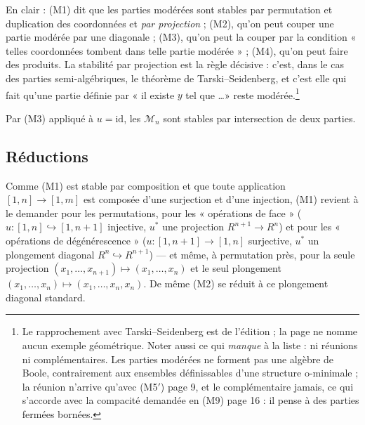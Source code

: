 \documentclass[11pt,a4paper]{article}
\begin{document}
En clair : (M1) dit que les parties modérées sont stables par permutation et
duplication des coordonnées et \emph{par projection} ; (M2), qu'on peut
couper une partie modérée par une diagonale ; (M3), qu'on peut la couper par
la condition « telles coordonnées tombent dans telle partie modérée » ; (M4),
qu'on peut faire des produits. La stabilité par projection est la règle
décisive : c'est, dans le cas des parties semi-algébriques, le théorème de
Tarski–Seidenberg, et c'est elle qui fait qu'une partie définie par « il
existe $y$ tel que \ldots » reste modérée.\footnote{Le rapprochement avec
Tarski–Seidenberg est de l'édition ; la page ne nomme aucun exemple
géométrique. Noter aussi ce qui \emph{manque} à la liste : ni réunions ni
complémentaires. Les parties modérées ne forment pas une algèbre de Boole,
contrairement aux ensembles définissables d'une structure o-minimale ; la
réunion n'arrive qu'avec (M5$'$) page 9, et le complémentaire jamais, ce qui
s'accorde avec la compacité demandée en (M9) page 16 : il pense à des
parties fermées bornées.}

Par (M3) appliqué à $u = \mathrm{id}$, les $\mathcal{M}_n$ sont stables par
intersection de deux parties.

\subsection*{Réductions}

Comme (M1) est stable par composition et que toute application
$[1,n] \to [1,m]$ est composée d'une surjection et d'une injection, (M1)
revient à le demander pour les permutations, pour les « opérations de face »
($u : [1,n] \hookrightarrow [1,n+1]$ injective, $u^*$ une projection
$R^{n+1} \to R^n$) et pour les « opérations de dégénérescence » ($u :
[1,n+1] \to [1,n]$ surjective, $u^*$ un plongement diagonal $R^n
\hookrightarrow R^{n+1}$) — et même, à permutation près, pour la seule
projection $(x_1, \dots, x_{n+1}) \mapsto (x_1, \dots, x_n)$ et le seul
plongement $(x_1, \dots, x_n) \mapsto (x_1, \dots, x_n, x_n)$. De même (M2) se
réduit à ce plongement diagonal standard.
\end{document}
